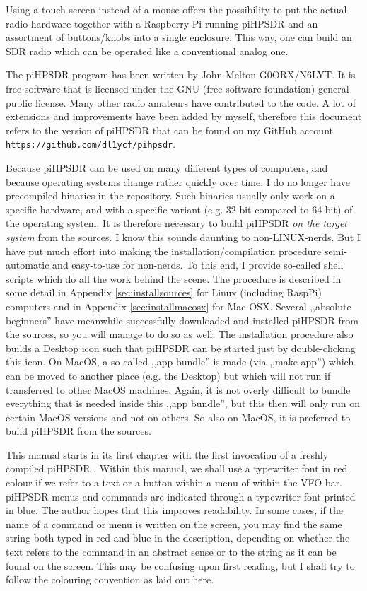 \documentclass[12pt]{book}
\def\pH{pi\-HPSDR }
\begin{document}
Using a touch-screen instead of a mouse offers the possibility to put the actual radio hardware together
with a Raspberry Pi running \pH and an assortment of buttons/knobs into a single enclosure. This way,
one can build an SDR radio which can be operated like a conventional analog one.

The \pH program has been written by John Melton G0ORX/N6LYT. It is free software that is licensed under
the GNU (free software foundation) general public license. Many other radio amateurs have contributed to
the code. A lot of extensions and improvements have been added by myself, therefore this document refers
to the version of \pH that can be found on my GitHub account \texttt{https://github.com/dl1ycf/pihpsdr}.

Because \pH can be used on many different types of computers, and because operating systems change
rather quickly over time, I do no longer have precompiled binaries in the repository. Such binaries
usually only work on a specific hardware, and with a specific variant (e.g. 32-bit compared to 64-bit) of
the operating system. It is therefore necessary to build \pH \textit{on the target system}
from the sources. I know this sounds daunting to non-LINUX-nerds. But I have put much effort into making
the installation/compilation procedure semi-automatic and easy-to-use for non-nerds.
To this end, I provide so-called shell scripts which do all the work behind the scene.
The procedure is described in some detail in Appendix \ref{sec:installsources} for Linux (including RaspPi)
computers and in Appendix \ref{sec:installmacosx} for Mac OSX. Several ,,absolute beginners'' have meanwhile
successfully downloaded and installed \pH from the sources, so you will manage to do so as well.
The installation procedure also builds a Desktop icon such that \pH can be started just by double-clicking
this icon.
On MacOS,
a so-called ,,app bundle'' is made (via ,,make app'') which can be moved to another place (e.g. the Desktop)
but which will not run if transferred to other MacOS machines. Again, it is not overly difficult
to bundle everything that is needed inside this ,,app bundle'', but this then will only run on certain
MacOS versions and not on others. So also on MacOS, it is preferred to build \pH from the sources.

This manual starts in its first chapter with the first invocation of a freshly compiled \pH.
Within this manual, we shall use a typewriter font in red colour if we refer to a text or a button within
a menu of within the VFO bar. \pH menus and commands are indicated through a typewriter font
printed in blue. The author hopes that this improves readability. In some cases, if the name of a command
or  menu is written on the screen, you may find the same string both typed in red and blue in the
description, depending on whether the text refers to the command in an abstract sense or to the string as it
can be found on the screen. This may be confusing upon first reading, but I shall try to follow the colouring
 convention as laid out here.
\end{document}
